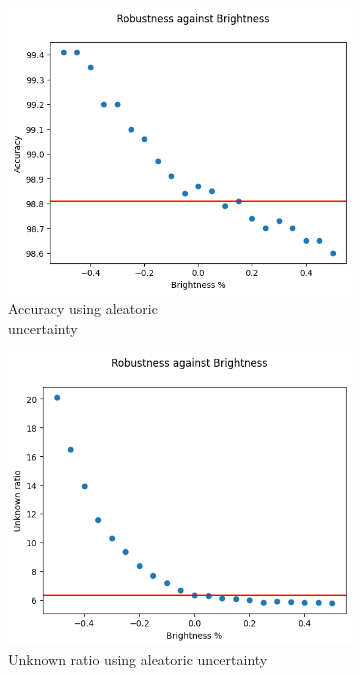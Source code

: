 \begin{figure}[h]
	\centering
	\begin{subfigure}{.33\textwidth}
		\centering
		\includegraphics[width=0.9\linewidth]{ImageFiles/EvalBNN/BR/AU/acc}
		\caption{Accuracy using aleatoric \\ uncertainty}
		\label{fig:br_au_acc}
	\end{subfigure}%
	\begin{subfigure}{.33\textwidth}
		\centering
		\includegraphics[width=0.9\linewidth]{ImageFiles/EvalBNN/BR/AU/unkn}
		\caption{Unknown ratio using aleatoric uncertainty}
		\label{fig:br_au_unkn}
	\end{subfigure}%
	\begin{subfigure}{.33\textwidth}

\end{subfigure}
\end{figure}
